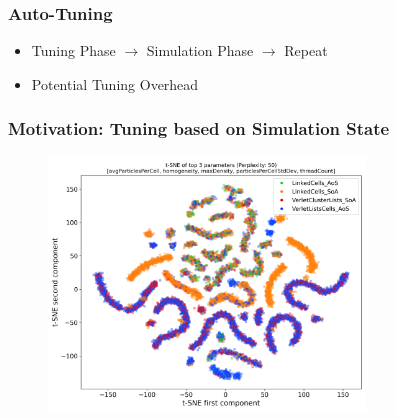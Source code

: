 \documentclass[
	10pt,
	t		%
]{beamer}
\begin{document}
\begin{frame}
	\frametitle{Auto-Tuning }
	
	\begin{itemize}
		\item Tuning Phase $\rightarrow$ Simulation Phase $\rightarrow$ Repeat
		\item Potential Tuning Overhead
	\end{itemize}
	
	\vspace{0.1cm}
	
	\begin{figure}
	\end{figure}
	
	
\end{frame}

\begin{frame}
	\frametitle{Motivation: Tuning based on Simulation State}
	
	\vspace{-0.2cm}
	
	\begin{figure}
		\centering
		\includegraphics[width=0.75\textwidth,trim={0 0 0 0cm},clip]{figures/t-SNE_Container_DataLayout_filtered.png}
	\end{figure}
	
\end{frame}
\end{document}
